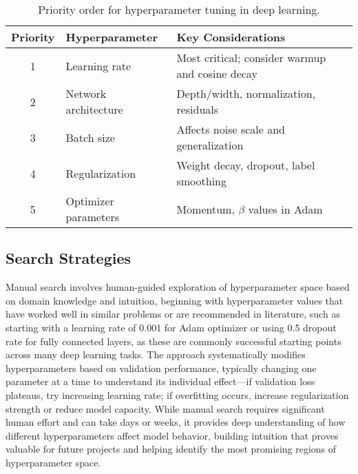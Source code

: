 \begin{table}[h]
\centering
\begin{tabular}{|c|p{}|p{}|}
\hline
\textbf{Priority} & \textbf{Hyperparameter} & \textbf{Key Considerations} \\
\hline
1 & Learning rate & Most critical; consider warmup and cosine decay \\
\hline
2 & Network architecture & Depth/width, normalization, residuals \\
\hline
3 & Batch size & Affects noise scale and generalization \\
\hline
4 & Regularization & Weight decay, dropout, label smoothing \\
\hline
5 & Optimizer parameters & Momentum, $\beta$ values in Adam \\
\hline
\end{tabular}
\caption{Priority order for hyperparameter tuning in deep learning.}
\label{tab:hyperparameter-priority}
\end{table}

\subsection{Search Strategies}

Manual search involves human-guided exploration of hyperparameter space based on domain knowledge and intuition, beginning with hyperparameter values that have worked well in similar problems or are recommended in literature, such as starting with a learning rate of 0.001 for Adam optimizer or using 0.5 dropout rate for fully connected layers, as these are commonly successful starting points across many deep learning tasks. The approach systematically modifies hyperparameters based on validation performance, typically changing one parameter at a time to understand its individual effect—if validation loss plateaus, try increasing learning rate; if overfitting occurs, increase regularization strength or reduce model capacity. While manual search requires significant human effort and can take days or weeks, it provides deep understanding of how different hyperparameters affect model behavior, building intuition that proves valuable for future projects and helping identify the most promising regions of hyperparameter space.

